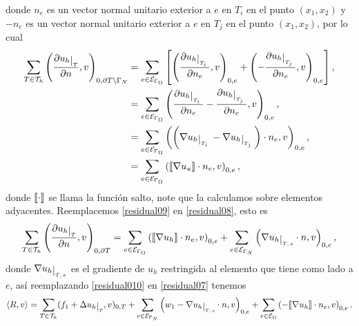donde $n_{e}$ es un vector normal unitario exterior a $e$ en $T_{i}$ en el punto $(x_{1},x_{2})$ y $-n_{e}$ es un vector normal unitario exterior a $e$ en $T_{j}$ en el punto $(x_{1},x_{2})$, por lo cual 
\begin{align}\label{residual09}
\sum_{T\in\mct_{h}} \left( \frac{\partial u_{h}\restr{ \text{\tiny $T$}}}{\partial n},v \right)_{0,\partial T \setminus \Gamma_{N}}&= \sum_{e\in\mce_{ \Gamma_{\Omega}}} \left[ \left( \frac{\partial u_{h}\restr{ \text{\tiny  $T_{i}$ } }}{\partial n_{e}} ,v \right)_{0,e} + \left( -\frac{\partial u_{h}\restr{ \text{\tiny  $T_{j}$ } }}{\partial n_{e}} ,v \right)_{0,e} \right],\nonumber\\
&= \sum_{e\in\mce_{ \Gamma_{\Omega}}} \left( \frac{\partial u_{h}\restr{ \text{\tiny  $T_{i}$ } }}{\partial n_{e}}  -\frac{\partial u_{h}\restr{ \text{\tiny  $T_{j}$ } }}{\partial n_{e}} ,v \right)_{0,e},\nonumber\\
&= \sum_{e\in\mce_{ \Gamma_{\Omega}}} \left( \left(\nabla u_{h}\restr{ \text{\tiny  $T_{i}$ } }  -\nabla u_{h}\restr{ \text{\tiny  $T_{j}$ } } \right)\cdot n_{e} ,v \right)_{0,e},\nonumber\\
&= \sum_{e\in\mce_{ \Gamma_{\Omega}}} \left( \lbt \nabla u_{u} \rbt \cdot n_{e},v  \right)_{0,e},
\end{align}
donde $\llbracket \cdot \rrbracket$ se llama la funci\'on salto, note que la calculamos sobre elementos adyacentes. Reemplacemos \eqref{residual09} en \eqref{residual08}, esto es
\begin{equation}\label{residual010}
\begin{split}
\sum_{T\in\mct_{h}} \left( \frac{\partial u_{h}\restr{\text{\tiny $T$}}}{\partial n} ,v \right)_{0,\partial T} = \sum_{e\in\mce_{ \Gamma_{\Omega}}} \left( \lbt \nabla u_{h} \rbt \cdot n_{e},v  \right)_{0,e} + \sum_{e\in\mce_{ \Gamma_{N}}}\left( \nabla u_{h}\restr{ \text{\tiny $T,e$}} \cdot n,v \right)_{0,e},
\end{split}
\end{equation}
donde $\nabla u_{h}\restr{ \text{\tiny $T,e$}}$  es el gradiente de $u_{h}$ restringida al elemento que tiene como lado a $e$, as\'i reemplazando \eqref{residual010}   en  \eqref{residual07} tenemos  
\begin{equation}\label{residual011}
\langle R,v \rangle = \sum_{T\in\mct_{h}} (f_{1}+\Delta u_{h}\restr{\text{\tiny $T$}},v)_{0,T} + \sum_{e\in \mce_{ \Gamma_{N}}} \left( w_{1} - \nabla u_{h}\restr{\text{\tiny $T,e$}} \cdot n ,v \right)_{0,e} + \sum_{e\in \mce_{ \Omega}} \left( -\lbt \nabla u_{h} \rbt \cdot n_{e},v\right)_{0,e}.
\end{equation}
